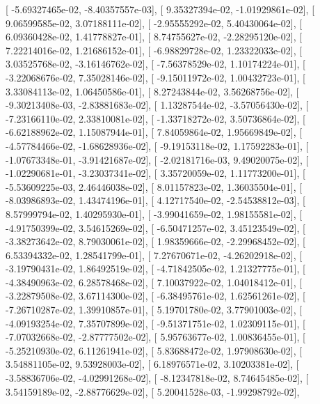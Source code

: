 \documentclass{article}
\begin{document}
       [ -5.69327465e-02,  -8.40357557e-03],
       [  9.35327394e-02,  -1.01929861e-02],
       [  9.06599585e-02,   3.07188111e-02],
       [ -2.95555292e-02,   5.40430064e-02],
       [  6.09360428e-02,   1.41778827e-01],
       [  8.74755627e-02,  -2.28295120e-02],
       [  7.22214016e-02,   1.21686152e-01],
       [ -6.98829728e-02,   1.23322033e-02],
       [  3.03525768e-02,  -3.16146762e-02],
       [ -7.56378529e-02,   1.10174224e-01],
       [ -3.22068676e-02,   7.35028146e-02],
       [ -9.15011972e-02,   1.00432723e-01],
       [  3.33084113e-02,   1.06450586e-01],
       [  8.27243844e-02,   3.56268756e-02],
       [ -9.30213408e-03,  -2.83881683e-02],
       [  1.13287544e-02,  -3.57056430e-02],
       [ -7.23166110e-02,   2.33810081e-02],
       [ -1.33718272e-02,   3.50736864e-02],
       [ -6.62188962e-02,   1.15087944e-01],
       [  7.84059864e-02,   1.95669849e-02],
       [ -4.57784466e-02,  -1.68628936e-02],
       [ -9.19153118e-02,   1.17592283e-01],
       [ -1.07673348e-01,  -3.91421687e-02],
       [ -2.02181716e-03,   9.49020075e-02],
       [ -1.02290681e-01,  -3.23037341e-02],
       [  3.35720059e-02,   1.11773200e-01],
       [ -5.53609225e-03,   2.46446038e-02],
       [  8.01157823e-02,   1.36035504e-01],
       [ -8.03986893e-02,   1.43474196e-01],
       [  4.12717540e-02,  -2.54538812e-03],
       [  8.57999794e-02,   1.40295930e-01],
       [ -3.99041659e-02,   1.98155581e-02],
       [ -4.91750399e-02,   3.54615269e-02],
       [ -6.50471257e-02,   3.45123549e-02],
       [ -3.38273642e-02,   8.79030061e-02],
       [  1.98359666e-02,  -2.29968452e-02],
       [  6.53394332e-02,   1.28541799e-01],
       [  7.27670671e-02,  -4.26202918e-02],
       [ -3.19790431e-02,   1.86492519e-02],
       [ -4.71842505e-02,   1.21327775e-01],
       [ -4.38490963e-02,   6.28578468e-02],
       [  7.10037922e-02,   1.04018412e-01],
       [ -3.22879508e-02,   3.67114300e-02],
       [ -6.38495761e-02,   1.62561261e-02],
       [ -7.26710287e-02,   1.39910857e-01],
       [  5.19701780e-02,   3.77901003e-02],
       [ -4.09193254e-02,   7.35707899e-02],
       [ -9.51371751e-02,   1.02309115e-01],
       [ -7.07032668e-02,  -2.87777502e-02],
       [  5.95763677e-02,   1.00836455e-01],
       [ -5.25210930e-02,   6.11261941e-02],
       [  5.83688472e-02,   1.97908630e-02],
       [  3.54881105e-02,   9.53928003e-02],
       [  6.18976571e-02,   3.10203381e-02],
       [ -3.58836706e-02,  -4.02991268e-02],
       [ -8.12347818e-02,   8.74645485e-02],
       [  3.54159189e-02,  -2.88776629e-02],
       [  5.20041528e-03,  -1.99298792e-02],
\end{document}
